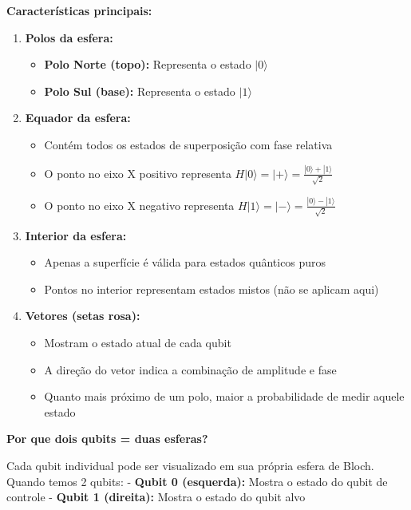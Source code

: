 \documentclass[
  brazilian,
]{report}
\providecommand{\tightlist}{%
  \setlength{\itemsep}{0pt}\setlength{\parskip}{0pt}}
\begin{document}
\textbf{Características principais:}

\begin{enumerate}
\def\labelenumi{\arabic{enumi}.}
\tightlist
\item
  \textbf{Polos da esfera:}

  \begin{itemize}
  \tightlist
  \item
    \textbf{Polo Norte (topo):} Representa o estado \(|0\rangle\)
  \item
    \textbf{Polo Sul (base):} Representa o estado \(|1\rangle\)
  \end{itemize}
\item
  \textbf{Equador da esfera:}

  \begin{itemize}
  \tightlist
  \item
    Contém todos os estados de superposição com fase relativa
  \item
    O ponto no eixo X positivo representa
    \(H|0\rangle = |+ \rangle = \frac{|0\rangle + |1\rangle}{\sqrt{2}}\)
  \item
    O ponto no eixo X negativo representa
    \(H|1\rangle = |-\rangle = \frac{|0\rangle - |1\rangle}{\sqrt{2}}\)
  \end{itemize}
\item
  \textbf{Interior da esfera:}

  \begin{itemize}
  \tightlist
  \item
    Apenas a superfície é válida para estados quânticos puros
  \item
    Pontos no interior representam estados mistos (não se aplicam aqui)
  \end{itemize}
\item
  \textbf{Vetores (setas rosa):}

  \begin{itemize}
  \tightlist
  \item
    Mostram o estado atual de cada qubit
  \item
    A direção do vetor indica a combinação de amplitude e fase
  \item
    Quanto mais próximo de um polo, maior a probabilidade de medir
    aquele estado
  \end{itemize}
\end{enumerate}

\textbf{Por que dois qubits = duas esferas?}

Cada qubit individual pode ser visualizado em sua própria esfera de
Bloch. Quando temos 2 qubits: - \textbf{Qubit 0 (esquerda):} Mostra o
estado do qubit de controle - \textbf{Qubit 1 (direita):} Mostra o
estado do qubit alvo
\end{document}
